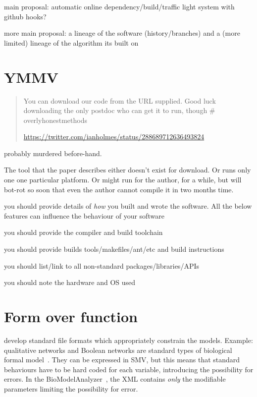 \documentclass[conference]{IEEEtran}
\begin{document}
main proposal: automatic online dependency/build/traffic light system
with github hooks?

more main proposal: a lineage of the software (history/branches) and a
(more limited) lineage of the algorithm its built on

\section{YMMV}

\begin{quote}
You can download our code from the URL supplied. Good luck downloading the only postdoc who can get it to run, though \# overlyhonestmethods

\url{https://twitter.com/ianholmes/status/288689712636493824} 
\end{quote}


probably murdered before-hand. 

The tool that the paper describes either doesn't exist for
download. Or runs only one one particular platform. Or might run for
the author, for a while, but will bot-rot so soon that even the author
cannot compile it in two months time.



you should provide details of \emph{how} you built and wrote the software. All the below features can influence the behaviour of your software

you should provide the compiler and build toolchain

you should provide builds tools/makefiles/ant/etc and build instructions

you should list/link to all non-standard packages/libraries/APIs

you should note the hardware and OS used


\section{Form over function}

develop standard file formats which appropriately constrain the
models. Example: qualitative networks and Boolean networks are
standard types of biological formal
model~\cite{Kauffman1969,Schaub2007}. They can be expressed in SMV,
but this means that standard behaviours have to be hard coded for each
variable, introducing the possibility for errors. In the
BioModelAnalyzer~\cite{Benque2012}, the XML contains \emph{only} the
modifiable parameters limiting the possibility for error.
\end{document}
